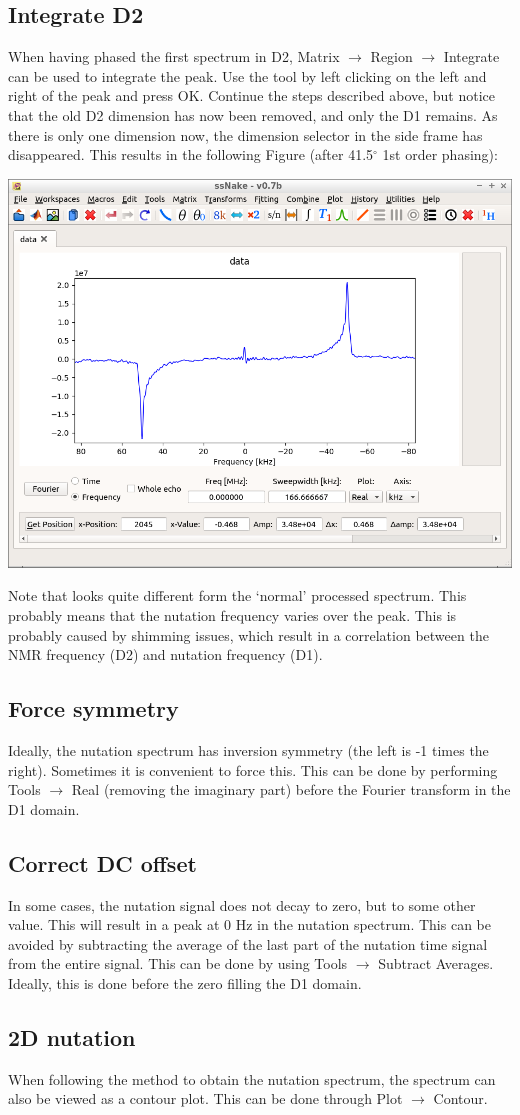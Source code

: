 \documentclass[11pt,a4paper]{article}
\begin{document}
\subsection{Integrate D2}
When having phased the first spectrum in D2, Matrix $\longrightarrow$ Region $\longrightarrow$ Integrate can be used to integrate the peak.
Use the tool by left clicking on the left and right of the peak and press OK.
Continue the steps described above, but notice that the old D2 dimension has now been removed, and only the D1 remains.
As there is only one dimension now, the dimension selector in the side frame has disappeared.
This results in the following Figure (after 41.5$^\circ$ 1st order phasing):
\begin{center}
\includegraphics[width=0.8\linewidth]{Figs/Fig5.png}
\end{center}
Note that looks quite different form the `normal' processed spectrum.
This probably means that the nutation frequency varies over the peak.
This is probably caused by shimming issues, which result in a correlation between the NMR frequency (D2) and nutation frequency (D1).



\subsection{Force symmetry}
Ideally, the nutation spectrum has inversion symmetry (the left is -1 times the right).
Sometimes it is convenient to force this.
This can be done by performing Tools $\longrightarrow$ Real (removing the imaginary part) before the Fourier transform in the D1 domain.

\subsection{Correct DC offset}
In some cases, the nutation signal does not decay to zero, but to some other value.
This will result in a peak at 0 Hz in the nutation spectrum.
This can be avoided by subtracting the average of the last part of the nutation time signal from the entire signal.
This can be done by using Tools $\longrightarrow$ Subtract Averages.
Ideally, this is done before the zero filling the D1 domain.

\subsection{2D nutation}
When following the method to obtain the nutation spectrum, the spectrum can also be viewed as a contour plot.
This can be done through Plot $\longrightarrow$ Contour.
\end{document}
